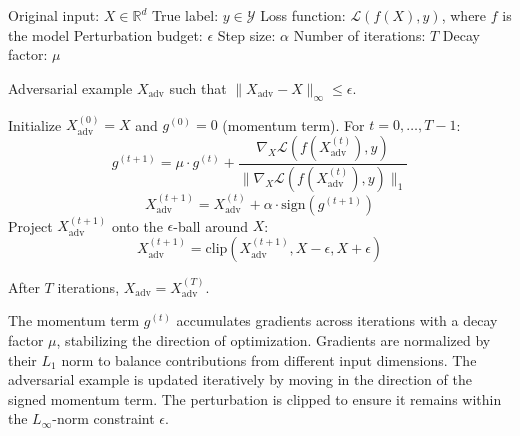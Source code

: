
Original input: $X \in \mathbb{R}^d$
True label: $y \in \mathcal{Y}$
Loss function: $\mathcal{L}(f(X), y)$, where $f$ is the model
Perturbation budget: $\epsilon$
Step size: $\alpha$
Number of iterations: $T$
Decay factor: $\mu$

Adversarial example $X_{\text{adv}}$ such that $\|X_{\text{adv}} - X\|_\infty \leq \epsilon$.

Initialize $X^{(0)}_{\text{adv}} = X$ and $g^{(0)} = 0$ (momentum term). For $t = 0, \dots, T-1$:
\[
g^{(t+1)} = \mu \cdot g^{(t)} + \frac{\nabla_X \mathcal{L}(f(X^{(t)}_{\text{adv}}), y)}{\|\nabla_X \mathcal{L}(f(X^{(t)}_{\text{adv}}), y)\|_1}
\]
\[
X^{(t+1)}_{\text{adv}} = X^{(t)}_{\text{adv}} + \alpha \cdot \text{sign}(g^{(t+1)})
\]
Project $X^{(t+1)}_{\text{adv}}$ onto the $\epsilon$-ball around $X$:
\[
X^{(t+1)}_{\text{adv}} = \text{clip}(X^{(t+1)}_{\text{adv}}, X - \epsilon, X + \epsilon)
\]

After $T$ iterations, $X_{\text{adv}} = X^{(T)}_{\text{adv}}$.

The momentum term $g^{(t)}$ accumulates gradients across iterations with a decay factor $\mu$, stabilizing the direction of optimization. Gradients are normalized by their $L_1$ norm to balance contributions from different input dimensions. The adversarial example is updated iteratively by moving in the direction of the signed momentum term. The perturbation is clipped to ensure it remains within the $L_\infty$-norm constraint $\epsilon$.